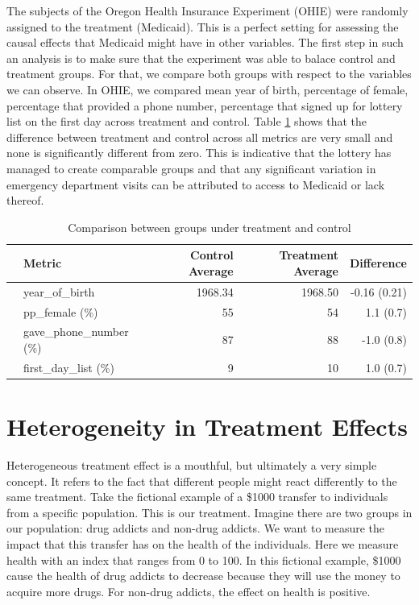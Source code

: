 The subjects of the Oregon Health Insurance Experiment (OHIE) were randomly assigned to the treatment (Medicaid). This is a perfect setting for assessing the causal effects that Medicaid might have in other variables. The first step in such an analysis is to make sure that the experiment was able to balace control and treatment groups. For that, we compare both groups with respect to the variables we can observe.  In OHIE, we compared mean year of birth, percentage of female, percentage that provided a phone number, percentage that signed up for lottery list on the first day across treatment and control. Table \ref{tab:treatment_control_comparison} shows that the difference between treatment and control across all metrics are very small and none is significantly different from zero. This is indicative that the lottery has managed to create comparable groups and that any significant variation in emergency department visits can be attributed to access to Medicaid or lack thereof.

\begin{table}[ht]
\centering
\begin{tabular}{rlrrr}
  \hline
    & Metric & Control Average & Treatment Average &  Difference \\ 
  \hline
   & year\_of\_birth          & 1968.34 & 1968.50 &  -0.16 (0.21)\\ 
   & pp\_female (\%)          & 55    & 54        &  1.1 (0.7) \\ 
   & gave\_phone\_number (\%) & 87    & 88        &  -1.0 (0.8) \\ 
   & first\_day\_list (\%)    & 9     & 10        &  1.0  (0.7)\\ 
   \hline
\end{tabular}
   \caption{\label{tab:treatment_control_comparison} Comparison between groups under treatment and control}
\end{table}

\newpage

\section{Heterogeneity in Treatment Effects}

Heterogeneous treatment effect is a mouthful, but ultimately a very simple concept. It refers to the fact that different people might react differently to the same treatment. Take the fictional example of a \$1000 transfer to individuals from a specific population. This is our treatment. Imagine there are two groups in our population: drug addicts and non-drug addicts. We want to measure the impact that this transfer has on the health of the individuals. Here we measure health with an index that ranges from 0 to 100. In this fictional example, \$1000 cause the health of drug addicts to decrease because they will use the money to acquire more drugs. For non-drug addicts, the effect on health is positive. 


